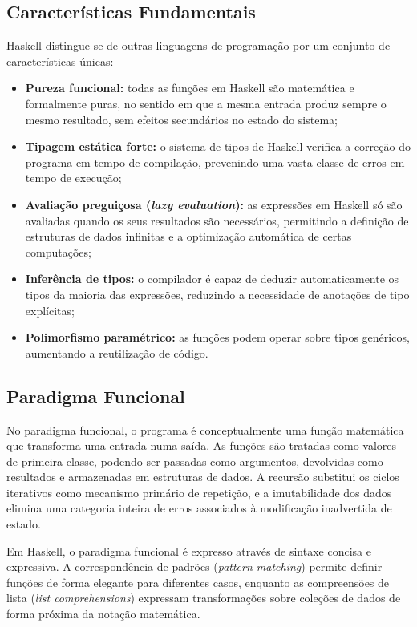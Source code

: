 \documentclass[12pt, a4paper, oneside]{report}
\begin{document}
\subsection{Características Fundamentais}

Haskell distingue-se de outras linguagens de programação por um conjunto de características únicas:

\begin{itemize}
  \item \textbf{Pureza funcional:} todas as funções em Haskell são matemática e formalmente puras, no sentido em que a mesma entrada produz sempre o mesmo resultado, sem efeitos secundários no estado do sistema;
  \item \textbf{Tipagem estática forte:} o sistema de tipos de Haskell verifica a correção do programa em tempo de compilação, prevenindo uma vasta classe de erros em tempo de execução;
  \item \textbf{Avaliação preguiçosa (\textit{lazy evaluation}):} as expressões em Haskell só são avaliadas quando os seus resultados são necessários, permitindo a definição de estruturas de dados infinitas e a optimização automática de certas computações;
  \item \textbf{Inferência de tipos:} o compilador é capaz de deduzir automaticamente os tipos da maioria das expressões, reduzindo a necessidade de anotações de tipo explícitas;
  \item \textbf{Polimorfismo paramétrico:} as funções podem operar sobre tipos genéricos, aumentando a reutilização de código.
\end{itemize}

\subsection{Paradigma Funcional}

No paradigma funcional, o programa é conceptualmente uma função matemática que transforma uma entrada numa saída. As funções são tratadas como valores de primeira classe, podendo ser passadas como argumentos, devolvidas como resultados e armazenadas em estruturas de dados. A recursão substitui os ciclos iterativos como mecanismo primário de repetição, e a imutabilidade dos dados elimina uma categoria inteira de erros associados à modificação inadvertida de estado.

Em Haskell, o paradigma funcional é expresso através de sintaxe concisa e expressiva. A correspondência de padrões (\textit{pattern matching}) permite definir funções de forma elegante para diferentes casos, enquanto as compreensões de lista (\textit{list comprehensions}) expressam transformações sobre coleções de dados de forma próxima da notação matemática.
\end{document}
